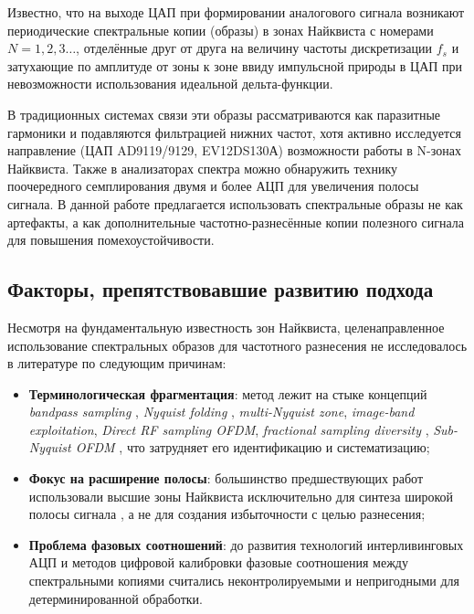 \documentclass[a4paper,12pt]{article}
\numberwithin{equation}{section}
\begin{document}
Известно, что на выходе ЦАП при формировании аналогового сигнала возникают периодические спектральные копии (образы) в зонах Найквиста с номерами $N = 1, 2, 3\dots$, отделённые друг от друга на величину частоты дискретизации $f_s$ \cite{oppenheim} и затухающие по амплитуде от зоны к зоне ввиду импульсной природы в ЦАП при невозможности использования идеальной дельта-функции. 

В традиционных системах связи эти образы рассматриваются как паразитные гармоники и подавляются фильтрацией нижних частот, хотя активно исследуется направление (ЦАП AD9119/9129, EV12DS130А) возможности работы в N-зонах Найквиста. Также в анализаторах спектра можно обнаружить технику поочередного семплирования двумя и более АЦП для увеличения полосы сигнала. В данной работе предлагается использовать спектральные образы не как артефакты, а как дополнительные частотно-разнесённые копии полезного сигнала для повышения помехоустойчивости.

\subsection*{Факторы, препятствовавшие развитию подхода}
Несмотря на фундаментальную известность зон Найквиста, целенаправленное использование спектральных образов для частотного разнесения не исследовалось в литературе по следующим причинам:
\begin{itemize}
    \item \textbf{Терминологическая фрагментация}: метод лежит на стыке концепций \textit{bandpass sampling} \cite{vaughan,rajasekaran}, \textit{Nyquist folding} \cite{fudge,murray}, \textit{multi-Nyquist zone}, \textit{image-band exploitation}, \textit{Direct RF sampling OFDM}, \textit{fractional sampling diversity} \cite{gadawe}, \textit{Sub-Nyquist OFDM} \cite{han}, что затрудняет его идентификацию и систематизацию;
    \item \textbf{Фокус на расширение полосы}: большинство предшествующих работ использовали высшие зоны Найквиста исключительно для синтеза широкой полосы сигнала \cite{vaughan,fudge}, а не для создания избыточности с целью разнесения;
    \item \textbf{Проблема фазовых соотношений}: до развития технологий интерливинговых АЦП и методов цифровой калибровки фазовые соотношения между спектральными копиями считались неконтролируемыми и непригодными для детерминированной обработки.
\end{itemize}
\end{document}
